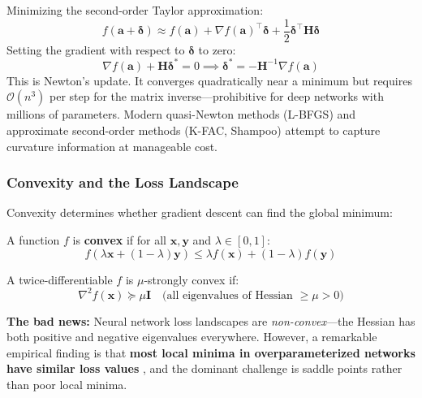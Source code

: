 \begin{example}
Minimizing the second-order Taylor approximation:
\begin{equation}
f(\mathbf{a} + \boldsymbol{\delta}) \approx f(\mathbf{a}) + \nabla f(\mathbf{a})^\top \boldsymbol{\delta} + \frac{1}{2}\boldsymbol{\delta}^\top \mathbf{H}\boldsymbol{\delta}
\end{equation}
Setting the gradient with respect to $\boldsymbol{\delta}$ to zero:
\begin{equation}
\nabla f(\mathbf{a}) + \mathbf{H}\boldsymbol{\delta}^* = 0 \implies \boldsymbol{\delta}^* = -\mathbf{H}^{-1}\nabla f(\mathbf{a})
\end{equation}
This is Newton's update. It converges quadratically near a minimum but requires $\mathcal{O}(n^3)$ per step for the matrix inverse---prohibitive for deep networks with millions of parameters. Modern quasi-Newton methods (L-BFGS) and approximate second-order methods (K-FAC, Shampoo) attempt to capture curvature information at manageable cost.
\end{example}

\subsubsection{Convexity and the Loss Landscape}

Convexity determines whether gradient descent can find the global minimum:

\begin{definition}
A function $f$ is \textbf{convex} if for all $\mathbf{x}, \mathbf{y}$ and $\lambda \in [0,1]$:
\begin{equation}
f(\lambda \mathbf{x} + (1-\lambda)\mathbf{y}) \leq \lambda f(\mathbf{x}) + (1-\lambda)f(\mathbf{y})
\end{equation}
\end{definition}

\begin{definition}
A twice-differentiable $f$ is $\mu$-strongly convex if:
\begin{equation}
\nabla^2 f(\mathbf{x}) \succeq \mu \mathbf{I} \quad \text{(all eigenvalues of Hessian $\geq \mu > 0$)}
\end{equation}
\end{definition}

\textbf{The bad news:} Neural network loss landscapes are \emph{non-convex}---the Hessian has both positive and negative eigenvalues everywhere. However, a remarkable empirical finding is that \textbf{most local minima in overparameterized networks have similar loss values} \cite{choromanska2015loss}, and the dominant challenge is saddle points rather than poor local minima.

